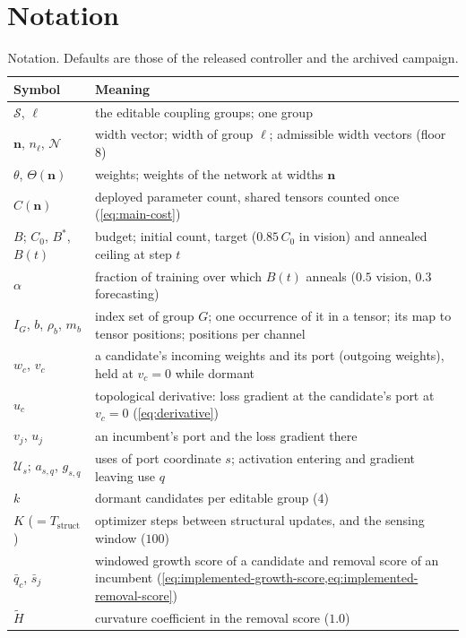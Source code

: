 \documentclass[10pt]{article}
\theoremstyle{paper}
\newcommand{\Sset}{\mathcal S}
\begin{document}
\section{Notation}
\label{app:notation}
\begin{table}[h]
\centering
\caption{Notation. Defaults are those of the released controller and the archived campaign.}
\label{tab:notation}
\footnotesize
\setlength{\tabcolsep}{4.0pt}
\begin{tabular}{@{}p{}p{}@{}}
\toprule
Symbol & Meaning \\
\midrule
$\Sset$, $\ell$ & the editable coupling groups; one group \\
$\bm n$, $n_\ell$, $\mathcal N$ & width vector; width of group $\ell$; admissible width vectors (floor $8$) \\
$\theta$, $\Theta(\bm n)$ & weights; weights of the network at widths $\bm n$ \\
$C(\bm n)$ & deployed parameter count, shared tensors counted once (\cref{eq:main-cost}) \\
$B$; $C_0$, $B^*$, $B(t)$ & budget; initial count, target ($0.85\,C_0$ in vision) and annealed ceiling at step $t$ \\
$\alpha$ & fraction of training over which $B(t)$ anneals ($0.5$ vision, $0.3$ forecasting) \\
$I_G$, $b$, $\rho_b$, $m_b$ & index set of group $G$; one occurrence of it in a tensor; its map to tensor positions; positions per channel \\
$w_c$, $v_c$ & a candidate's incoming weights and its port (outgoing weights), held at $v_c=0$ while dormant \\
$u_c$ & topological derivative: loss gradient at the candidate's port at $v_c=0$ (\cref{eq:derivative}) \\
$v_j$, $u_j$ & an incumbent's port and the loss gradient there \\
$\mathcal U_s$; $a_{s,q}$, $g_{s,q}$ & uses of port coordinate $s$; activation entering and gradient leaving use $q$ \\
$k$ & dormant candidates per editable group ($4$) \\
$K$ ($=T_{\mathrm{struct}}$) & optimizer steps between structural updates, and the sensing window ($100$) \\
$\bar q_c$, $\bar s_j$ & windowed growth score of a candidate and removal score of an incumbent (\cref{eq:implemented-growth-score,eq:implemented-removal-score}) \\
$\widetilde H$ & curvature coefficient in the removal score ($1.0$) \\

\end{tabular}
\end{table}
\end{document}
